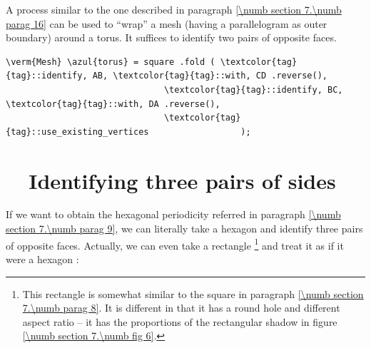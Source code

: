 A process similar to the one described in paragraph \ref{\numb section 7.\numb parag 16}
can be used to ``wrap'' a mesh (having a parallelogram as outer boundary) around
a torus.
It suffices to identify two pairs of opposite faces.

\begin{Verbatim}[commandchars=\\\{\},formatcom=\small\tt,frame=single,
   label=parag-\ref{\numb section 7.\numb parag 17}.cpp,rulecolor=\color{coment},
   baselinestretch=0.94,framesep=2mm                                             ]
   \verm{Mesh} \azul{torus} = square .fold ( \textcolor{tag}{tag}::identify, AB, \textcolor{tag}{tag}::with, CD .reverse(),
                               \textcolor{tag}{tag}::identify, BC, \textcolor{tag}{tag}::with, DA .reverse(),
                               \textcolor{tag}{tag}::use_existing_vertices                  );
\end{Verbatim}


\section{~~Identifying three pairs of sides}\label{\numb section 7.\numb parag 18}

If we want to obtain the hexagonal periodicity referred in paragraph
\ref{\numb section 7.\numb parag 9}, we can literally take a hexagon and
identify three pairs of opposite faces.
Actually, we can even take a rectangle%
\footnote{This rectangle is somewhat similar to the square in paragraph
\ref{\numb section 7.\numb parag 8}.
It is different in that it has a round hole and different aspect ratio --
it has the proportions of the rectangular shadow in figure \ref{\numb section 7.\numb fig 6}.}
and treat it as if it were a hexagon :

